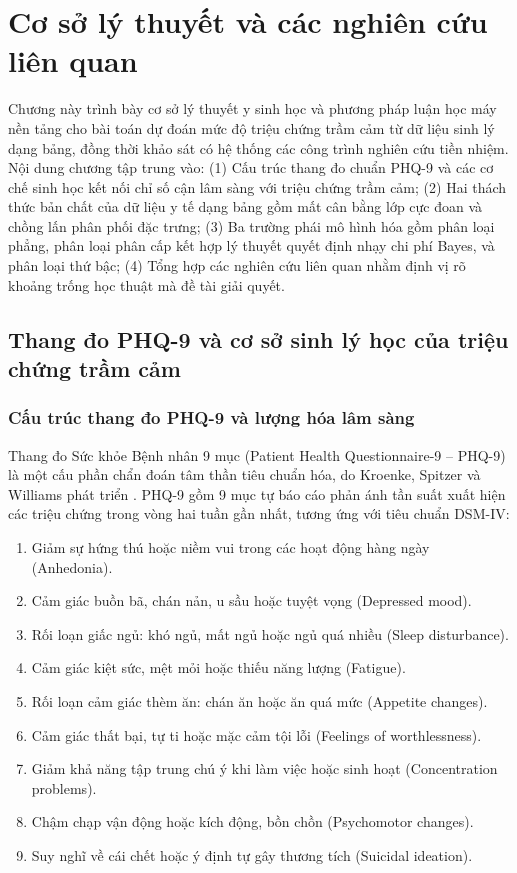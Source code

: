 \chapter{Cơ sở lý thuyết và các nghiên cứu liên quan}
\label{ch:co-so-ly-thuyet}

Chương này trình bày cơ sở lý thuyết y sinh học và phương pháp luận học máy nền tảng cho bài toán dự đoán mức độ triệu chứng trầm cảm từ dữ liệu sinh lý dạng bảng, đồng thời khảo sát có hệ thống các công trình nghiên cứu tiền nhiệm. Nội dung chương tập trung vào: (1) Cấu trúc thang đo chuẩn PHQ-9 và các cơ chế sinh học kết nối chỉ số cận lâm sàng với triệu chứng trầm cảm; (2) Hai thách thức bản chất của dữ liệu y tế dạng bảng gồm mất cân bằng lớp cực đoan và chồng lấn phân phối đặc trưng; (3) Ba trường phái mô hình hóa gồm phân loại phẳng, phân loại phân cấp kết hợp lý thuyết quyết định nhạy chi phí Bayes, và phân loại thứ bậc; (4) Tổng hợp các nghiên cứu liên quan nhằm định vị rõ khoảng trống học thuật mà đề tài giải quyết.

\section{Thang đo PHQ-9 và cơ sở sinh lý học của triệu chứng trầm cảm}
\label{sec:thang-do-phq9-va-sinh-ly}

\subsection{Cấu trúc thang đo PHQ-9 và lượng hóa lâm sàng}
\label{subsec:cau-truc-phq9}

Thang đo Sức khỏe Bệnh nhân 9 mục (Patient Health Questionnaire-9 -- PHQ-9) là một cấu phần chẩn đoán tâm thần tiêu chuẩn hóa, do Kroenke, Spitzer và Williams phát triển \cite{kroenke2001phq, spitzer1999validation}. PHQ-9 gồm 9 mục tự báo cáo phản ánh tần suất xuất hiện các triệu chứng trong vòng hai tuần gần nhất, tương ứng với tiêu chuẩn DSM-IV:
\begin{enumerate}
    \item Giảm sự hứng thú hoặc niềm vui trong các hoạt động hàng ngày (Anhedonia).
    \item Cảm giác buồn bã, chán nản, u sầu hoặc tuyệt vọng (Depressed mood).
    \item Rối loạn giấc ngủ: khó ngủ, mất ngủ hoặc ngủ quá nhiều (Sleep disturbance).
    \item Cảm giác kiệt sức, mệt mỏi hoặc thiếu năng lượng (Fatigue).
    \item Rối loạn cảm giác thèm ăn: chán ăn hoặc ăn quá mức (Appetite changes).
    \item Cảm giác thất bại, tự ti hoặc mặc cảm tội lỗi (Feelings of worthlessness).
    \item Giảm khả năng tập trung chú ý khi làm việc hoặc sinh hoạt (Concentration problems).
    \item Chậm chạp vận động hoặc kích động, bồn chồn (Psychomotor changes).
    \item Suy nghĩ về cái chết hoặc ý định tự gây thương tích (Suicidal ideation).
\end{enumerate}

